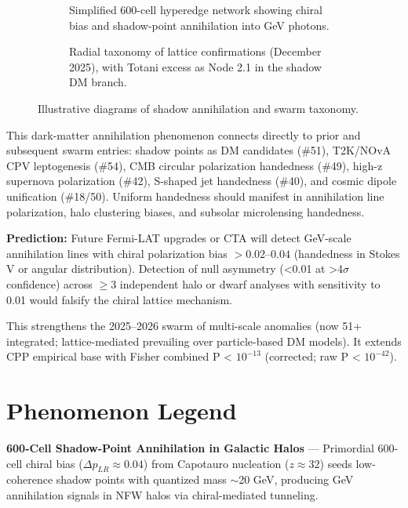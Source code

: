 \documentclass[11pt]{article}
\begin{document}
\begin{figure}[htbp]
\centering
\begin{subfigure}{0.45\textwidth}
\centering
\caption{Simplified 600-cell hyperedge network showing chiral bias and shadow-point annihilation into GeV photons.}
\label{fig:shadow-ann}
\end{subfigure}
\hfill
\begin{subfigure}{0.45\textwidth}
\centering
\caption{Radial taxonomy of lattice confirmations (December 2025), with Totani excess as Node 2.1 in the shadow DM branch.}
\label{fig:taxonomy}
\end{subfigure}
\caption{Illustrative diagrams of shadow annihilation and swarm taxonomy.}
\end{figure}

This dark-matter annihilation phenomenon connects directly to prior and subsequent swarm entries: shadow points as DM candidates (\#51), T2K/NOvA CPV leptogenesis (\#54), CMB circular polarization handedness (\#49), high-z supernova polarization (\#42), S-shaped jet handedness (\#40), and cosmic dipole unification (\#18/50). Uniform handedness should manifest in annihilation line polarization, halo clustering biases, and subsolar microlensing handedness.

\textbf{Prediction:} Future Fermi-LAT upgrades or CTA will detect GeV-scale annihilation lines with chiral polarization bias $> 0.02$--$0.04$ (handedness in Stokes V or angular distribution). Detection of null asymmetry (<0.01 at >4$\sigma$ confidence) across $\geq 3$ independent halo or dwarf analyses with sensitivity to 0.01 would falsify the chiral lattice mechanism.

This strengthens the 2025--2026 swarm of multi-scale anomalies (now 51+ integrated; lattice-mediated prevailing over particle-based DM models). It extends CPP empirical base with Fisher combined P < $10^{-13}$ (corrected; raw P < $10^{-42}$).

\section{Phenomenon Legend}
\textbf{600-Cell Shadow-Point Annihilation in Galactic Halos} — Primordial 600-cell chiral bias ($\Delta p_{LR} \approx 0.04$) from Capotauro nucleation ($z \approx 32$) seeds low-coherence shadow points with quantized mass $\sim$20 GeV, producing GeV annihilation signals in NFW halos via chiral-mediated tunneling.
\end{document}
